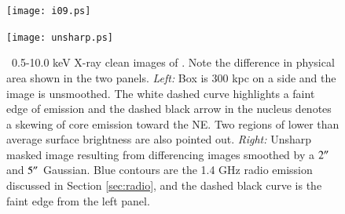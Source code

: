 \begin{figure}
  \begin{center}
    \begin{minipage}{0.495\linewidth}
      \texttt{[image: i09.ps]}
    \end{minipage}
    \begin{minipage}{0.495\linewidth}
      \texttt{[image: unsharp.ps]}
    \end{minipage}
    \caption{\cxo\ 0.5-10.0 keV X-ray clean images of \irs. Note the
      difference in physical area shown in the two
      panels. {\it{Left:}} Box is 300 kpc on a side and the image is
      unsmoothed. The white dashed curve highlights a faint edge of
      emission and the dashed black arrow in the nucleus denotes a
      skewing of core emission toward the NE. Two regions of lower
      than average surface brightness are also pointed
      out. {\it{Right:}} Unsharp masked image resulting from
      differencing images smoothed by a $2\rm{^\prime}\hskip -0.1em\rm{^\prime}$ and $5\rm{^\prime}\hskip -0.1em\rm{^\prime}$
      Gaussian. Blue contours are the 1.4 GHz radio emission discussed
      in Section \ref{sec:radio}, and the dashed black curve is the
      faint edge from the left panel.}
    \label{fig:imgs}
  \end{center}
\end{figure}

